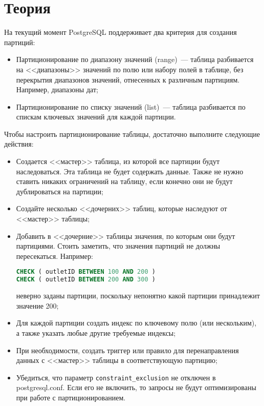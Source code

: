 \section{Теория}

На текущий момент PostgreSQL поддерживает два критерия для создания партиций:

\begin{itemize}
  \item Партиционирование по диапазону значений (range)~--- таблица разбивается на <<диапазоны>> значений по полю или набору полей в таблице, без перекрытия диапазонов значений, отнесенных к различным партициям. Например, диапазоны дат;
  \item Партиционирование по списку значений (list)~--- таблица разбивается по спискам ключевых значений для каждой партиции.
\end{itemize}

Чтобы настроить партиционирование таблицы, достаточно выполните следующие действия:

\begin{itemize}
  \item Создается <<мастер>> таблица, из которой все партиции будут наследоваться. Эта таблица не будет содержать данные. Также не нужно ставить никаких ограничений на таблицу, если конечно они не будут дублироваться на партиции;
  \item Создайте несколько <<дочерних>> таблиц, которые наследуют от <<мастер>> таблицы;
  \item Добавить в <<дочерние>> таблицы значения, по которым они будут партициями. Стоить заметить, что значения партиций не должны пересекаться. Например:

\begin{lstlisting}[language=SQL,label=lst:partitioning1,caption=Пример неверного задания значений партиций]
CHECK ( outletID BETWEEN 100 AND 200 )
CHECK ( outletID BETWEEN 200 AND 300 )
\end{lstlisting}

  неверно заданы партиции, поскольку непонятно какой партиции принадлежит значение 200;
  \item Для каждой партиции создать индекс по ключевому полю (или нескольким), а также указать любые другие требуемые индексы;
  \item При необходимости, создать триггер или правило для перенаправления данных с <<мастер>> таблицы в соответствующую партицию;
  \item Убедиться, что параметр \lstinline!constraint_exclusion! не отключен в postgresql.conf. Если его не включить, то запросы не будут оптимизированы при работе с партиционированием.
\end{itemize}


